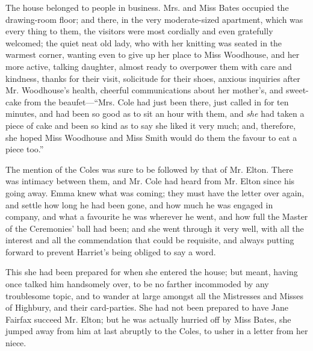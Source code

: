 The house belonged to people in business. Mrs. and Miss Bates occupied the drawing-room floor; and there, in the very moderate-sized apartment, which was every thing to them, the visitors were most cordially and even gratefully welcomed; the quiet neat old lady, who with her knitting was seated in the warmest corner, wanting even to give up her place to Miss Woodhouse, and her more active, talking daughter, almost ready to overpower them with care and kindness, thanks for their visit, solicitude for their shoes, anxious inquiries after Mr. Woodhouse's health, cheerful communications about her mother's, and sweet-cake from the beaufet---“Mrs. Cole had just been there, just called in for ten minutes, and had been so good as to sit an hour with them, and {\em she} had taken a piece of cake and been so kind as to say she liked it very much; and, therefore, she hoped Miss Woodhouse and Miss Smith would do them the favour to eat a piece too.”

The mention of the Coles was sure to be followed by that of Mr. Elton. There was intimacy between them, and Mr. Cole had heard from Mr. Elton since his going away. Emma knew what was coming; they must have the letter over again, and settle how long he had been gone, and how much he was engaged in company, and what a favourite he was wherever he went, and how full the Master of the Ceremonies' ball had been; and she went through it very well, with all the interest and all the commendation that could be requisite, and always putting forward to prevent Harriet's being obliged to say a word.

This she had been prepared for when she entered the house; but meant, having once talked him handsomely over, to be no farther incommoded by any troublesome topic, and to wander at large amongst all the Mistresses and Misses of Highbury, and their card-parties. She had not been prepared to have Jane Fairfax succeed Mr. Elton; but he was actually hurried off by Miss Bates, she jumped away from him at last abruptly to the Coles, to usher in a letter from her niece.


